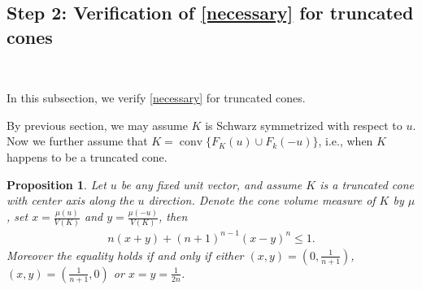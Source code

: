 \documentclass[12pt]{amsart}
\newtheorem{proposition}{Proposition}
\numberwithin{equation}{section}
\numberwithin{lemma}{section}
\numberwithin{proposition}{section}
\numberwithin{corollary}{section}
\numberwithin{remark}{section}
\begin{document}
\subsection{Step 2: Verification of \eqref{necessary} for truncated cones}
\ 

In this subsection, we verify \eqref{necessary} for truncated cones. 

By previous section, we may assume $K$ is Schwarz symmetrized with respect to $u$.
Now we further assume that $K=\operatorname{conv}\{F_{K}(u)\cup F_{k}(-u)\}$, i.e., when $K$ happens to be a truncated cone. 

\begin{proposition} \label{P2}
Let $u$ be any fixed unit vector, and assume $K$ is a truncated cone with center axis along the $u$ direction. Denote the cone volume measure of $K$ by $\mu$, set $x=\frac{\mu(u)}{V(K)}$ and $y=\frac{\mu (-u)}{V(K)}$, then 
    \begin{align} \label{algebraic}
    n(x+y)+(n+1)^{n-1}(x-y)^{n}\leq 1.
    \end{align}
    Moreover the equality holds if and only if either $(x,y)=(0, \frac{1}{n+1})$, $(x,y)=(\frac{1}{n+1}, 0)$ or $x=y=\frac{1}{2n}$. 
\end{proposition}
\end{document}
